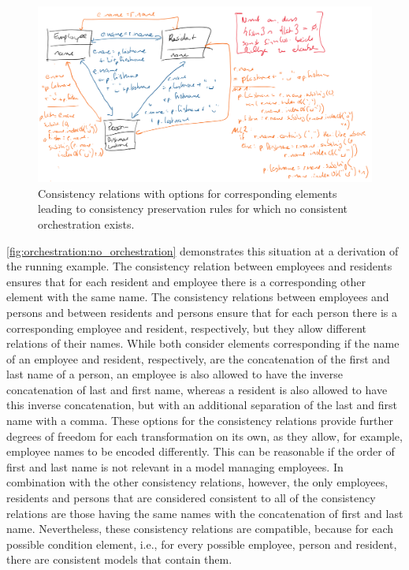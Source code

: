 \begin{figure}
    \centering
    \includegraphics[width=\textwidth]{figures/correctness/orchestration/no_orchestration.png}
    \caption[Consistency preservation rules without orchestration]{Consistency relations with options for corresponding elements leading to consistency preservation rules for which no consistent orchestration exists.}
    \label{fig:orchestration:no_orchestration}
\end{figure}

\autoref{fig:orchestration:no_orchestration} %
demonstrates this situation at a derivation of the running example.
The consistency relation between employees and residents ensures that for each resident and employee there is a corresponding other element with the same name.
The consistency relations between employees and persons and between residents and persons ensure that for each person there is a corresponding employee and resident, respectively, but they allow different relations of their names.
While both consider elements corresponding if the name of an employee and resident, respectively, are the concatenation of the first and last name of a person, an employee is also allowed to have the inverse concatenation of last and first name, whereas a resident is also allowed to have this inverse concatenation, but with an additional separation of the last and first name with a comma.
These options for the consistency relations provide further degrees of freedom for each transformation on its own, as they allow, for example, employee names to be encoded differently.
This can be reasonable if the order of first and last name is not relevant in a model managing employees.
In combination with the other consistency relations, however, the only employees, residents and persons that are considered consistent to all of the consistency relations are those having the same names with the concatenation of first and last name.
Nevertheless, these consistency relations are compatible, because for each possible condition element, i.e., for every possible employee, person and resident, there are consistent models that contain them.

